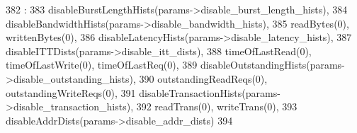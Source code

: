 \begin{DoxyCode}
382                                                       :
383             disableBurstLengthHists(params->disable_burst_length_hists),
384             disableBandwidthHists(params->disable_bandwidth_hists),
385             readBytes(0), writtenBytes(0),
386             disableLatencyHists(params->disable_latency_hists),
387             disableITTDists(params->disable_itt_dists),
388             timeOfLastRead(0), timeOfLastWrite(0), timeOfLastReq(0),
389             disableOutstandingHists(params->disable_outstanding_hists),
390             outstandingReadReqs(0), outstandingWriteReqs(0),
391             disableTransactionHists(params->disable_transaction_hists),
392             readTrans(0), writeTrans(0),
393             disableAddrDists(params->disable_addr_dists)
394         { }

\end{DoxyCode}


